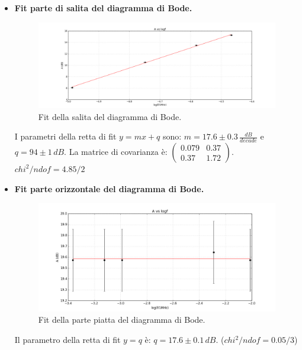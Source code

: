 \documentclass[10pt,a4paper]{article}
\begin{document}
\begin{itemize}
\item \textbf{Fit parte di salita del diagramma di Bode.}

\begin{figure}[!htb]
  \centering
  \includegraphics[scale=0.5]{salita.png}
\caption{Fit della salita del diagramma di Bode.}
\label{salita}
\end{figure}

I parametri della retta di fit $y = mx+q$ sono: $m = 17.6 \pm 0.3 \, \frac{dB}{decade}$ e $q = 94 \pm 1 \, dB$. La matrice di covarianza è:
$\left( \begin{array}{cc}
0.079 & 0.37 \\ 
0.37 & 1.72
\end{array} \right)$.\\
$chi^2/ndof = 4.85/2$

\item \textbf{Fit parte orizzontale del diagramma di Bode.}

\begin{figure}[!htb]
  \centering
  \includegraphics[scale=1.0]{orizzontale.png}
\caption{Fit della parte piatta del diagramma di Bode.}
\label{orizz}
\end{figure}



Il parametro della retta di fit $y = q$ è: $q = 17.6 \pm 0.1 \, dB$. ($chi^2/ndof = 0.05/3$)


\end{itemize}
\end{document}
